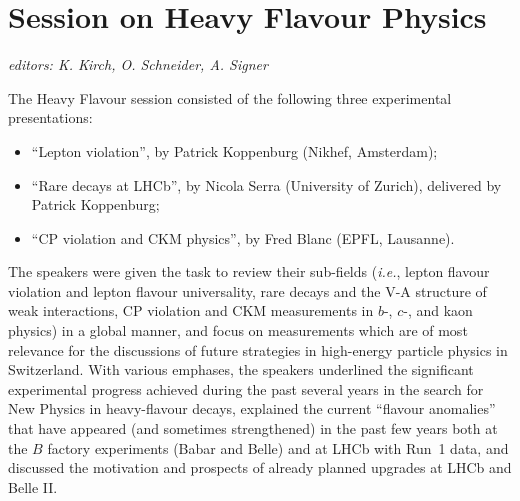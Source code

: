 \section{Session on Heavy Flavour Physics}\label{flavour}{\it editors: K. Kirch, O. Schneider, A. Signer}

\noindent The Heavy Flavour session consisted of the following three experimental presentations:
\begin{itemize} \setlength{\itemsep}{-1ex}
\item ``Lepton violation'', by Patrick Koppenburg (Nikhef, Amsterdam);
\item ``Rare decays at LHCb'', by Nicola Serra (University of Zurich), delivered by Patrick Koppenburg;
\item ``CP violation and CKM physics'', by Fred Blanc (EPFL, Lausanne).
\end{itemize}

\noindent The speakers were given the task to review their sub-fields ({\it i.e.},  lepton flavour violation and lepton flavour 
universality, rare decays and the V-A structure of weak interactions, CP violation and CKM measurements in $b$-, $c$-,
and kaon physics) in a global manner, and focus on measurements which are of most relevance for the discussions of
future strategies in high-energy particle physics in Switzerland. With various emphases, the speakers underlined the
significant experimental progress achieved during the past several years in the search for New Physics in heavy-flavour
decays, explained the current ``flavour anomalies'' that have appeared (and sometimes strengthened) in the past few 
years both at the $B$ factory experiments (Babar and Belle) and at LHCb with Run~1 data, and discussed the motivation 
and prospects of already planned upgrades at LHCb  and Belle II.

\medskip

